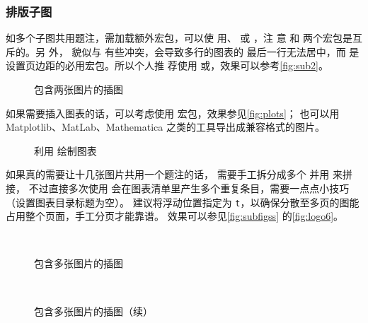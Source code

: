 \subsubsection{排版子图}

如多个子图共用题注，需加载额外宏包，可以使
用、 或 ，注
意 和 两个宏包是互斥的。另
外， 貌似与  有些冲突，会导致多行的图表的
最后一行无法居中，而  是设置页边距的必用宏包。所以个人推
荐使用 或，效果可以参考\autoref{fig:sub2}。

\begin{figure}[htb]
  \quad
  \caption{包含两张图片的插图}
  \label{fig:subfigs}
\end{figure}

如果需要插入图表的话，可以考虑使用  宏包，效果参见\autoref{fig:plots}；
也可以用 Matplotlib、MatLab、Mathematica 之类的工具导出成兼容格式的图片。

\begin{figure}[htb]
   \quad
  \caption{利用  绘制图表}
  \label{fig:plots}
\end{figure}

如果真的需要让十几张图片共用一个题注的话，
需要手工拆分成多个  并用  来拼接，
不过直接多次使用  会在图表清单里产生多个重复条目，需要一点点小技巧
（设置图表目录标题为空）。
建议将浮动位置指定为 \verb|t|，以确保分散至多页的图能占用整个页面，手工分页才能靠谱。
效果可以参见\autoref{fig:subfigss} 的\autoref{fig:logo6}。

\begin{figure}[t]
  \quad
  \\
  \quad
  \caption{包含多张图片的插图}
  \label{fig:subfigss}
\end{figure}
\begin{figure}[t]
  \ContinuedFloat
  \quad
  \\
  \quad
  \caption[]{包含多张图片的插图（续）}
\end{figure}

